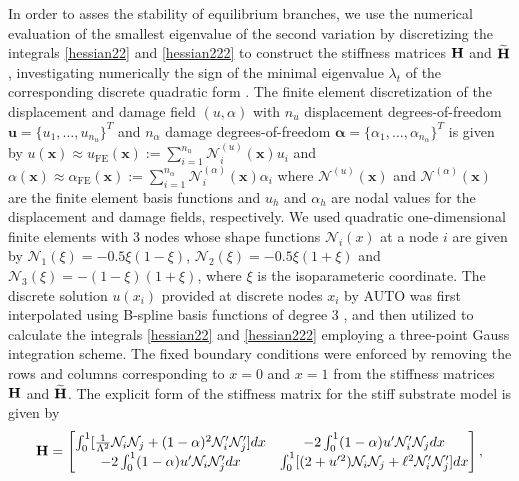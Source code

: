 In order to asses the stability of equilibrium branches, we use  the numerical evaluation of the smallest eigenvalue of the second variation by discretizing the integrals \eqref{hessian22} and   \eqref{hessian222} to construct the stiffness matrices
$\mathbf{H}$ and $\widetilde{\mathbf{H}}$, investigating numerically the sign of the minimal eigenvalue $\lambda_t$ of the corresponding discrete quadratic form \cite{Sanderson2016-ht}.  The finite element discretization of the displacement and damage field $(u, \alpha )$     with \( n_u \) displacement degrees-of-freedom 
$
\mathbf{u} = \{ u_1, \ldots, u_{n_u} \}^T 
$
and \( n_\alpha \) damage degrees-of-freedom 
$
\boldsymbol{\alpha} = \{ \alpha_1, \ldots, \alpha_{n_\alpha} \}^T
$ is given by 
$
u(\mathbf{x}) \approx u_{\text{FE}} (\mathbf{x}) := \sum_{i=1}^{n_u} \mathcal{N}^{(u)}_i(\mathbf{x}) u_i $
and $\alpha(\mathbf{x}) \approx \alpha_{\text{FE}} (\mathbf{x}) := \sum_{i=1}^{n_\alpha} \mathcal{N}^{(\alpha)}_i (\mathbf{x}) \alpha_i 
$
where $\mathcal{N}^{(u)}(\mathbf{x}) $ and $\mathcal{N}^{(\alpha)}(\mathbf{x}) $ are the finite element basis functions and  $u_h$ and  $\alpha_h$ are nodal values for the displacement and damage fields, respectively. We used quadratic one-dimensional finite elements with 3 nodes  whose   shape functions   ${\mathcal N}_i(x)$ at a node $i$  are given by ${\mathcal N}_1(\xi)=-0.5\xi(1-\xi)$, ${\mathcal N}_2(\xi)=-0.5\xi(1+\xi)$ and ${\mathcal N}_3(\xi)=-(1-\xi)(1+\xi)$, where $\xi$ is the isoparameteric coordinate. The discrete solution $u(x_i)$ provided at discrete nodes $x_i$ by AUTO was first interpolated using B-spline basis functions of degree 3 \cite{Grimstad2016-cq}, and then utilized to calculate the integrals \eqref{hessian22} and \ref{hessian222} employing a three-point Gauss integration scheme. The fixed boundary conditions were enforced by removing the rows and columns corresponding to $x = 0$ and $x = 1$ from the stiffness matrices 
$\mathbf{H}$ and $\widetilde{\mathbf{H}}$. The explicit form of the stiffness matrix for the stiff substrate model is given by
\begin{equation}
    \mathbf{H} = 
    \begin{bmatrix}
\int_0^1[ \frac{1}{\Lambda^2}{\mathcal N}_i{\mathcal N}_j + (1-\alpha)^2{\mathcal N}'_i{\mathcal N}'_j
] dx&
-2\int_0^1(1-\alpha)u' {\mathcal N}'_i {\mathcal N}_j  dx\\
-2\int_0^1(1-\alpha)u' {\mathcal N}_i {\mathcal N}'_j dx
& \int_0^1 [ (2+u'^2){\mathcal N}_i{\mathcal N}_j +\ell^2{\mathcal N}'_i{\mathcal N}'_j] dx
\end{bmatrix},
\label{eq:stifness1}
\end{equation}
